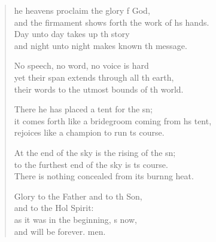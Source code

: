 \settowidth{\versewidth}{it comes forth like a bridegroom coming from his tent, *}
\begin{verse}%
  \begin{patverse}
he heavens proclaim the glory f God,\Med\\
and the firmament shows forth the work of h\pointup{\i}s hands.\\
Day unto day takes up th story\Med\\
and night unto night makes known th message.

No speech, no word, no voice is hard\Flex\\
yet their span extends through all th earth,\Med\\
their words to the utmost bounds of th world.

There he has placed a tent for the sn;\Flex\\
it comes forth like a bridegroom coming from hs tent,\Med\\
rejoices like a champion to run \pointup{\i}ts course.

At the end of the sky is the rising of the sn;\Flex\\
to the furthest end of the sky is ts course.\Med\\
There is nothing concealed from its burn\pointup{\i}ng heat.

Glory to the Father and to th Son,\Med\\
and to the Hol Spirit:\\
as it was in the beginning, s now,\Med\\
and will be forever. men. 
  \end{patverse}
\end{verse}
